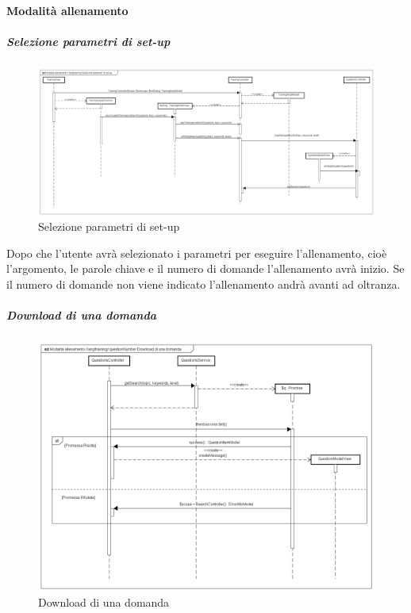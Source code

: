 \paragraph{Modalità allenamento}

\subparagraph{Selezione parametri di set-up}

\label{Selezione parametri di set-up}

\begin{figure}[ht]
	\centering
	\includegraphics[scale=0.25,keepaspectratio]{UML/DiagrammiDiSequenza/Front-end/Training_setUp.png}
	\caption{Selezione parametri di set-up}
\end{figure} \FloatBarrier

Dopo che l'utente avrà selezionato i parametri per eseguire l'allenamento, cioè l'argomento, le parole chiave e il numero di domande l'allenamento avrà inizio. Se il numero di domande non viene indicato l'allenamento andrà avanti ad oltranza.

\subparagraph{Download di una domanda}

\label{Download di una domanda}

\begin{figure}[ht]
	\centering
	\includegraphics[scale=0.25,keepaspectratio]{UML/DiagrammiDiSequenza/Front-end/Training_downloadAquestion.png}
	\caption{Download di una domanda}
\end{figure} \FloatBarrier

